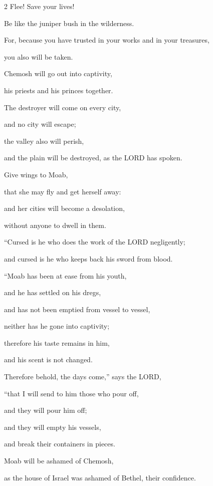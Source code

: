 \begin{multicols}{2}
\myverse{}Flee! Save your lives!

Be like the juniper bush in the wilderness.


\myverse{}For, because you have trusted in your works and in your treasures,

you also will be taken.

Chemosh will go out into captivity,

his priests and his princes together.


\myverse{}The destroyer will come on every city,

and no city will escape;

the valley also will perish,

and the plain will be destroyed, as the LORD has spoken.


\myverse{}Give wings to Moab,

that she may fly and get herself away:

and her cities will become a desolation,

without anyone to dwell in them.

\vspace{\baselineskip}

\myverse{}“Cursed is he who does the work of the LORD negligently;

and cursed is he who keeps back his sword from blood.

\vspace{\baselineskip}

\myverse{}“Moab has been at ease from his youth,

and he has settled on his dregs,

and has not been emptied from vessel to vessel,

neither has he gone into captivity;

therefore his taste remains in him,

and his scent is not changed.


\myverse{}Therefore behold, the days come,” says the LORD,

“that I will send to him those who pour off,

and they will pour him off;

and they will empty his vessels,

and break their containers in pieces.


\myverse{}Moab will be ashamed of Chemosh,

as the house of Israel was ashamed of Bethel, their confidence.


\end{multicols}
